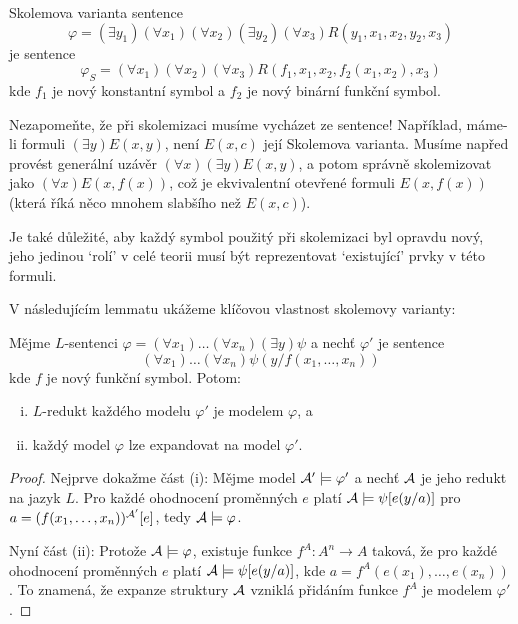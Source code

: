 \begin{example}
    Skolemova varianta sentence 
    $$\varphi=(\exists y_1)(\forall x_1)(\forall x_2)(\exists y_2)(\forall x_3)R(y_1,x_1,x_2,y_2,x_3)$$
    je sentence
    $$
    \varphi_S=(\forall x_1)(\forall x_2)(\forall x_3)R(f_1,x_1,x_2,f_2(x_1,x_2),x_3)
    $$
    kde $f_1$ je nový konstantní symbol a $f_2$ je nový binární funkční symbol.
\end{example}

\begin{remark}
    Nezapomeňte, že při skolemizaci musíme vycházet ze sentence! Například, máme-li formuli $(\exists y)E(x,y)$, není $E(x,c)$ její Skolemova varianta. Musíme napřed provést generální uzávěr $(\forall x)(\exists y)E(x,y)$, a potom správně skolemizovat jako $(\forall x)E(x,f(x))$, což je ekvivalentní otevřené formuli $E(x,f(x))$ (která říká něco mnohem slabšího než $E(x,c)$).

    Je také důležité, aby každý symbol použitý při skolemizaci byl opravdu nový, jeho jedinou `rolí' v celé teorii musí být reprezentovat `existující' prvky v této formuli.
\end{remark} 

V následujícím lemmatu ukážeme klíčovou vlastnost skolemovy varianty:

\begin{lemma}\label{lemma:skolem-variant-conservative-extension}
Mějme $L$-sentenci $\varphi=(\forall x_1)\dots(\forall x_n)(\exists y)\psi$ a nechť $\varphi'$ je sentence 
$$
(\forall x_1)\dots(\forall x_n)\psi(y/f(x_1,\dots,x_n))$$
kde $f$ je nový funkční symbol. Potom:
\begin{enumerate}[(i)]
    \item $L$-redukt každého modelu $\varphi'$ je modelem $\varphi$, a 
    \item každý model $\varphi$ lze expandovat na model $\varphi'$.
\end{enumerate}
\end{lemma}

\begin{proof}
    Nejprve dokažme část (i): Mějme model $\mathcal{A}'\models\varphi'$ a nechť $\mathcal{A}$ je jeho redukt na jazyk $L$. Pro každé ohodnocení proměnných $e$ platí $\mathcal{A}\models\psi[e(y/a)]$ pro $a=(f(x_1,\dots,x_n))^{\mathcal{A}'}[e]$, tedy $\mathcal{A}\models\varphi$.
    
    Nyní část (ii): Protože $\mathcal{A}\models\varphi$, existuje funkce $f^A:A^n\to A$ taková, že pro každé ohodnocení proměnných $e$ platí $\mathcal{A}\models \psi[e(y/a)]$, kde $a=f^A(e(x_1),\dots,e(x_n))$. To znamená, že expanze struktury $\mathcal{A}$ vzniklá přidáním funkce $f^A$ je modelem $\varphi'$.    
\end{proof}

